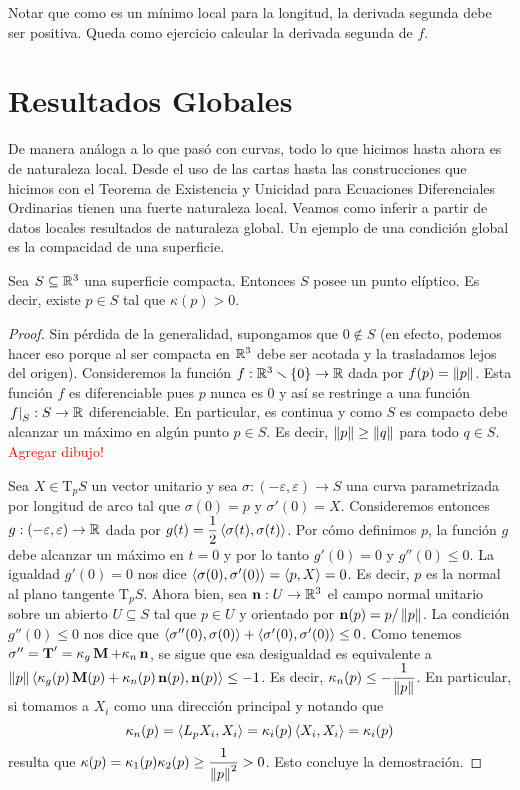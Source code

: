 \begin{obs}
Notar que como es un mínimo local para la longitud, la derivada segunda debe ser positiva. Queda como ejercicio calcular la derivada segunda de $f$.
\end{obs}

\section{Resultados Globales}

De manera análoga a lo que pasó con curvas, todo lo que hicimos hasta ahora es de naturaleza local. Desde el uso de las cartas hasta las construcciones que hicimos con el Teorema de Existencia y Unicidad para Ecuaciones Diferenciales Ordinarias tienen una fuerte naturaleza local. Veamos como inferir a partir de datos locales resultados de naturaleza global. Un ejemplo de una condición global es la compacidad de una superficie.

\begin{prop}
Sea $S\subseteq\mathbb{R}^3$ una superficie compacta. Entonces $S$ posee un punto elíptico. Es decir, existe $p\in S$ tal que $\kappa(p)>0$.
\begin{proof}
Sin pérdida de la generalidad, supongamos que $0\notin S$ (en efecto, podemos hacer eso porque al ser compacta en $\mathbb{R}^3$ debe ser acotada y la trasladamos lejos del origen). Consideremos la función $f:\mathbb{R}^3\smallsetminus\{0\}\to\mathbb{R}$ dada por $f(p)=\left\| p \right\|$. Esta función $f$ es diferenciable pues $p$ nunca es $0$ y así se restringe a una función $\left. f\right|_S :S\to\mathbb{R}$ diferenciable. En particular, es continua y como $S$ es compacto debe alcanzar un máximo en algún punto $p\in S$. Es decir, $\left\| p \right\|\geq\left\| q \right\|$ para todo $q\in S$. \textcolor{red}{Agregar dibujo!}

Sea $X\in\mathrm{T}_pS$ un vector unitario y sea $\sigma:(-\varepsilon,\varepsilon)\to S$ una curva parametrizada por longitud de arco tal que $\sigma(0)=p$ y $\sigma'(0)=X$. Consideremos entonces $g:(-\varepsilon,\varepsilon)\to\mathbb{R}$ dada por $g(t)=\dfrac{1}{2}\left\langle \sigma(t),\sigma(t) \right\rangle$. Por cómo definimos $p$, la función $g$ debe alcanzar un máximo en $t=0$ y por lo tanto $g'(0)=0$ y $g''(0)\leq 0$. La igualdad $g'(0)=0$ nos dice $\left\langle \sigma(0),\sigma'(0) \right\rangle=\left\langle p,X \right\rangle=0$. Es decir, $p$ es la normal al plano tangente $\mathrm{T}_pS$. Ahora bien, sea $\operatorname{\mathbf{n}}:U\to\mathbb{R}^3$ el campo normal unitario sobre un abierto $U\subseteq S$ tal que $p\in U$ y orientado por $\operatorname{\mathbf{n}}(p)=p/\left\| p \right\|$. La condición $g''(0)\leq 0$ nos dice que $\left\langle \sigma''(0),\sigma(0) \right\rangle+\left\langle \sigma'(0),\sigma'(0) \right\rangle\leq 0$. Como tenemos $\sigma''=\operatorname{\mathbf{T}}'=\kappa_g \operatorname{\mathbf{M}} +\kappa_n \operatorname{\mathbf{n}}$, se sigue que esa desigualdad es equivalente a $\left\| p \right\|\left\langle \kappa_g(p)\operatorname{\mathbf{M}}(p)+\kappa_n(p)\operatorname{\mathbf{n}}(p),\operatorname{\mathbf{n}}(p) \right\rangle\leq -1$. Es decir, $\kappa_n(p)\leq -\dfrac{1}{\left\| p \right\|}$. En particular, si tomamos a $X_i$ como una dirección principal y notando que $$\kappa_n(p) = \left\langle L_p X_i,X_i \right\rangle = \kappa_i(p)\left\langle X_i,X_i \right\rangle=\kappa_i(p)$$ resulta que $\kappa(p)=\kappa_1(p)\kappa_2(p)\geq\dfrac{1}{\left\| p \right\|^2}>0$. Esto concluye la demostración.
\end{proof}
\end{prop}

